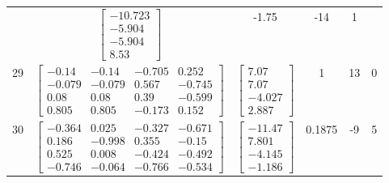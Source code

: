 \documentclass[a4paper,12pt]{article}
\begin{document}
\begin{tabular}{c c c c c c}
&
$\begin{bmatrix} -10.723 \\ -5.904 \\ -5.904 \\ 8.53 \end{bmatrix}$
&
-1.75
&
-14
&
1
\\
29
&
$\begin{bmatrix} -0.14 & -0.14 & -0.705 & 0.252 \\ -0.079 & -0.079 & 0.567 & -0.745 \\ 0.08 & 0.08 & 0.39 & -0.599 \\ 0.805 & 0.805 & -0.173 & 0.152 \end{bmatrix}$
&
$\begin{bmatrix} 7.07 \\ 7.07 \\ -4.027 \\ 2.887 \end{bmatrix}$
&
1
&
13
&
0
\\
30
&
$\begin{bmatrix} -0.364 & 0.025 & -0.327 & -0.671 \\ 0.186 & -0.998 & 0.355 & -0.15 \\ 0.525 & 0.008 & -0.424 & -0.492 \\ -0.746 & -0.064 & -0.766 & -0.534 \end{bmatrix}$
&
$\begin{bmatrix} -11.47 \\ 7.801 \\ -4.145 \\ -1.186 \end{bmatrix}$
&
0.1875
&
-9
&
5
\\
\end{tabular} \egroup \newpage
\end{document}

